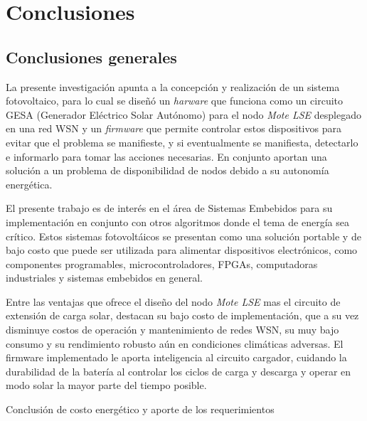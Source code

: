 
\chapter{Conclusiones} %

\label{Chapter5} %

\section{Conclusiones generales}

La presente investigación apunta a la concepción y realización de un sistema fotovoltaico, para lo cual se diseñó un \textit{harware} que funciona como un circuito GESA (Generador Eléctrico Solar Autónomo) para el nodo \textit{Mote LSE} desplegado en una red WSN y un \textit{firmware} que permite controlar estos dispositivos para evitar que el problema se manifieste, y si eventualmente se manifiesta, detectarlo e informarlo para tomar las acciones necesarias. En conjunto aportan una solución a un problema de disponibilidad de nodos debido a su autonomía energética.

El presente trabajo es de interés en el área de Sistemas Embebidos para su implementación en conjunto con otros algoritmos donde el tema de energía sea crítico. Estos sistemas fotovoltáicos se presentan como una solución portable y de bajo costo que puede ser utilizada para alimentar dispositivos electrónicos, como componentes programables, microcontroladores, FPGAs, computadoras industriales y sistemas embebidos en general.

Entre las ventajas que ofrece el diseño del nodo \textit{Mote LSE} mas el circuito de extensión de carga solar, destacan su bajo costo de implementación, que a su vez disminuye costos de operación y mantenimiento de redes WSN, su muy bajo consumo y su rendimiento robusto aún en condiciones climáticas adversas. El firmware implementado le aporta inteligencia al circuito cargador, cuidando la durabilidad de la batería al controlar los ciclos de carga y descarga y operar en modo solar la mayor parte del tiempo posible.

Conclusión de costo energético y aporte de los requerimientos


